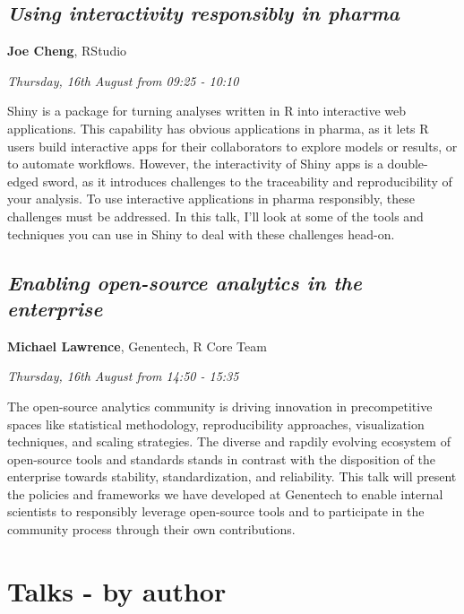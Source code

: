 \documentclass[]{book}
\theoremstyle{definition}
\theoremstyle{definition}
\theoremstyle{definition}
\theoremstyle{remark}
\begin{document}
\hypertarget{using-interactivity-responsibly-in-pharma}{%
\section{\texorpdfstring{\emph{Using interactivity responsibly in
pharma}}{Using interactivity responsibly in pharma}}\label{using-interactivity-responsibly-in-pharma}}

\textbf{Joe Cheng}, RStudio

\emph{Thursday, 16th August from 09:25 - 10:10}

Shiny is a package for turning analyses written in R into interactive
web applications. This capability has obvious applications in pharma, as
it lets R users build interactive apps for their collaborators to
explore models or results, or to automate workflows. However, the
interactivity of Shiny apps is a double-edged sword, as it introduces
challenges to the traceability and reproducibility of your analysis. To
use interactive applications in pharma responsibly, these challenges
must be addressed. In this talk, I'll look at some of the tools and
techniques you can use in Shiny to deal with these challenges head-on.

\hypertarget{enabling-open-source-analytics-in-the-enterprise}{%
\section{\texorpdfstring{\emph{Enabling open-source analytics in the
enterprise}}{Enabling open-source analytics in the enterprise}}\label{enabling-open-source-analytics-in-the-enterprise}}

\textbf{Michael Lawrence}, Genentech, R Core Team

\emph{Thursday, 16th August from 14:50 - 15:35}

The open-source analytics community is driving innovation in
precompetitive spaces like statistical methodology, reproducibility
approaches, visualization techniques, and scaling strategies. The
diverse and rapdily evolving ecosystem of open-source tools and
standards stands in contrast with the disposition of the enterprise
towards stability, standardization, and reliability. This talk will
present the policies and frameworks we have developed at Genentech to
enable internal scientists to responsibly leverage open-source tools and
to participate in the community process through their own contributions.

\hypertarget{talks---by-author}{%
\chapter{Talks - by author}\label{talks---by-author}}
\end{document}
